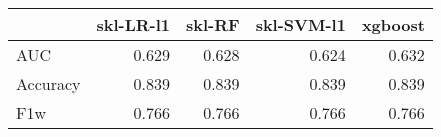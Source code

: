 \begin{tabular}{lrrrr}
\toprule
{} &  skl-LR-l1 &  skl-RF &  skl-SVM-l1 &  xgboost \\
\midrule
AUC      &      0.629 &   0.628 &       0.624 &    0.632 \\
Accuracy &      0.839 &   0.839 &       0.839 &    0.839 \\
F1w      &      0.766 &   0.766 &       0.766 &    0.766 \\
\bottomrule
\end{tabular}
